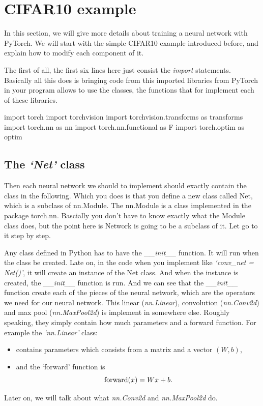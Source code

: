 \section{CIFAR10 example} %
In this section, we will give more details about training a neural network with PyTorch. We will start with the simple CIFAR10 example introduced before, and explain how to modify each component of it. 

The first of all, the first six lines here just consist the \emph{import} statements. Basically all this does is bringing code from this imported libraries from PyTorch in your program allows to use the classes, the functions that for implement each of these libraries.
\begin{python}
import torch 
import torchvision
import torchvision.transforms as transforms
import torch.nn as nn
import torch.nn.functional as F
import torch.optim as optim
\end{python}

\subsection{The \emph{`Net'} class}
Then each neural network we should to implement should exactly contain the class in the following. Which you does is that you define a new class called Net, which is a subclass of nn.Module. The nn.Module is a class implemented in the package torch.nn. Bascially you don't have to know exactly what the Module class does, but the point here is Network is going to be a subclass of it. Let go to it step by step.

Any class defined in Python has to have the \emph{\_\_init\_\_} function. It will run when the class be created. Late on, in the code when you implement like \emph{`conv\_net = Net()'}, it will create an instance of the Net class. And when the instance is created, the \emph{\_\_init\_\_} function is run. And we can see that the \emph{\_\_init\_\_} function create each of the pieces of the neural network, which are the operators we need for our neural network. This linear (\emph{nn.Linear}), convolution (\emph{nn.Conv2d}) and max pool (\emph{nn.MaxPool2d}) is implement in somewhere else. Roughly speaking, they simply contain how much parameters and a forward function. For example the \emph{`nn.Linear'} class: 
\begin{itemize}
\item contains parameters which consists from a matrix and a vector $(W,b)$,
\item and the `forward' function is
$${\rm forward}(x) = Wx+b.$$
\end{itemize}
Later on, we will talk about what \emph{nn.Conv2d} and \emph{nn.MaxPool2d} do.

